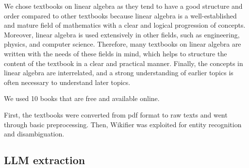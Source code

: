 \documentclass{article}
\begin{document}
We chose textbooks on linear algebra as they tend to have a good structure and order compared to other textbooks because linear algebra is a well-established and mature field of mathematics with a clear and logical progression of concepts. Moreover, linear algebra is used extensively in other fields, such as engineering, physics, and computer science. Therefore, many textbooks on linear algebra are written with the needs of these fields in mind, which helps to structure the content of the textbook in a clear and practical manner. Finally, the concepts in linear algebra are interrelated, and a strong understanding of earlier topics is often necessary to understand later topics. 

We used 10 books that are free and available online. 

First, the textbooks were converted from pdf format to raw texts and went through basic preprocessing. Then, Wikifier \citep{brank2017annotating} was exploited for entity recognition and disambiguation.



\subsection{LLM extraction}

\end{document}
